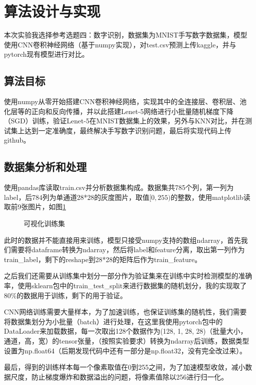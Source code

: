 
\section{算法设计与实现}

本次实验我选择参考选题四：数字识别，数据集为MNIST手写数字数据集，模型使用CNN卷积神经网络（基于numpy实现）\cite{zhouzhihua}，对test.csv预测上传kaggle，并与pytorch现有模型进行对比。

\subsection{算法目标}

使用numpy从零开始搭建CNN卷积神经网络，实现其中的全连接层、卷积层、池化层等的正向和反向传播，并以此搭建Lenet-5网络进行小批量随机梯度下降（SGD）训练，验证Lenet-5在MNIST数据集上的效果，另外与KNN对比，并在测试集上达到一定准确度，最终解决手写数字识别问题，最后将实现代码上传github。

\subsection{数据集分析和处理}

使用pandas库读取train.csv并分析数据集构成。数据集共785个列，第一列为label，后784列为单通道28*28的灰度图片，取值$[0, 255)$的整数，使用matplotlib读取前9张图片，如图\ref{fig2-1}

\begin{figure}[h!]
    \centering
    
    \caption{可视化训练集}
    \label{fig2-1}
\end{figure}

此时的数据并不能直接用来训练，模型只接受numpy支持的数组ndarray，首先我们需要将dataframe转换为ndarray，然后将label和feature分离，取出第一列作为train\_label，剩下的reshape到28*28的矩阵后作为train\_feature。

之后我们还需要从训练集中划分一部分作为验证集来在训练中实时检测模型的准确率，使用sklearn包中的train\_test\_split来进行数据集的随机划分，我的实现取了80\%的数据用于训练，剩下的用于验证。

CNN网络训练需要大量样本，为了加速训练，也保证训练集的随机性，我们需要将数据集划分为小批量（batch）进行处理，在这里我使用pytorch包中的DataLoader来加载数据，每一次取出128个数据作为(128, 1, 28, 28)（批量大小，通道，高，宽）的tensor张量，（按照实验要求）转换为ndarray后训练，数据类型设置为np.float64（后期发现代码中还有一部分是np.float32，没有完全改过来）。

最后，得到的训练样本每一个像素取值在0到255之间，为了加速模型收敛，减小数据尺度，防止梯度爆炸和数据溢出的问题，将像素值除以256进行归一化。


